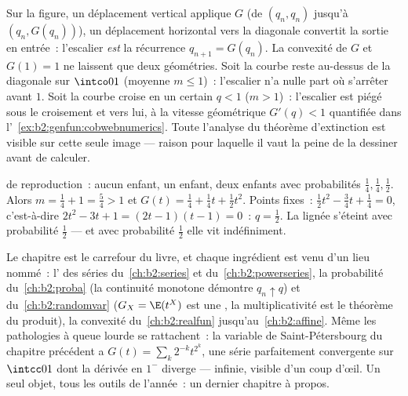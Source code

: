 \begin{remark}
Sur la figure, un déplacement vertical applique $G$ (de $(q_n, q_n)$
jusqu'à $(q_n, G(q_n))$), un déplacement horizontal vers la diagonale
convertit la sortie en entrée~: l'escalier \emph{est} la
récurrence $q_{n+1} = G(q_n)$. La convexité de $G$ et $G(1) = 1$
ne laissent que deux géométries. Soit la courbe reste au-dessus de la
diagonale sur $\intco01$ (moyenne $m \leq 1$)~: l'escalier n'a
nulle part où s'arrêter avant $1$. Soit la courbe croise en un certain
$q < 1$ ($m > 1$)~: l'escalier est piégé sous le croisement
et  vers lui, à la vitesse géométrique $G'(q) < 1$
quantifiée dans l'~\cref{ex:b2:genfun:cobwebnumerics}. Toute
l'analyse du théorème d'extinction est visible sur cette seule
image --- raison pour laquelle il vaut la peine de la dessiner avant
de calculer.
\end{remark}

\begin{example}\label{ex:b2:genfun:branchingexample}
 de reproduction~: aucun enfant, un enfant, deux enfants avec
probabilités $\frac14, \frac14, \frac12$. Alors $m = \frac14 + 1 =
\frac54 > 1$ et $G(t) = \frac14 + \frac14 t + \frac12 t^2$. Points
fixes~: $\frac12 t^2 - \frac34 t + \frac14 = 0$, c'est-à-dire $2t^2 - 3t
+ 1 = (2t - 1)(t - 1) = 0$~: $q = \frac12$. La lignée s'éteint
avec probabilité $\frac12$ --- et avec probabilité $\frac12$
elle vit indéfiniment.
\end{example}

\begin{remark}
Le chapitre est le carrefour du livre, et chaque ingrédient
est venu d'un lieu nommé~: l' des séries du~\cref{ch:b2:series}
et du~\cref{ch:b2:powerseries}, la probabilité du~\cref{ch:b2:proba}
(la continuité monotone démontre $q_n \uparrow q$) et
du~\cref{ch:b2:randomvar} ($G_X =
\E(t^X)$ est une , la multiplicativité est le théorème du
produit), la convexité du~\cref{ch:b2:realfun} jusqu'au~\cref{ch:b2:affine}.
Même les pathologies à queue lourde se rattachent~:
la variable de Saint-Pétersbourg du chapitre précédent a
$G(t) = \sum_k2^{-k}t^{2^k}$, une série parfaitement convergente
sur $\intcc01$ dont la dérivée en $1^-$ diverge ---
 infinie, visible d'un coup d'œil. Un seul objet, tous les
outils de l'année~: un dernier chapitre à propos.
\end{remark}

